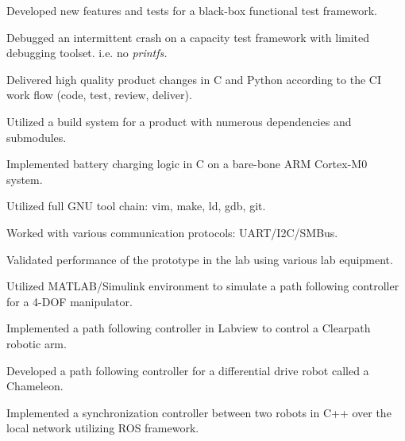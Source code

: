\documentclass[]{deedy-resume-openfont}
\begin{document}

\begin{tightemize}
\item Developed new features and tests for a black-box functional test framework.
\item Debugged an intermittent crash on a capacity test framework with limited debugging toolset. i.e. no \it{printfs}.
\item Delivered high quality product changes in C and Python according to the CI work flow (code, test, review, deliver).
\item Utilized a build system for a product with numerous dependencies and submodules.
\end{tightemize}
\sectionsep

\begin{tightemize}
\item Implemented battery charging logic in C on a bare-bone ARM Cortex-M0 system.
\item Utilized full GNU tool chain: vim, make, ld, gdb, git.
\item Worked with various communication protocols: UART/I2C/SMBus.
\item Validated performance of the prototype in the lab using various lab equipment.
\end{tightemize}
\sectionsep

\begin{tightemize}
\item Utilized MATLAB/Simulink environment to simulate a path following controller for a 4-DOF manipulator.
\item Implemented a path following controller in Labview to control a Clearpath robotic arm.
\item Developed a path following controller for a differential drive robot called a Chameleon.
\item Implemented a synchronization controller between two robots in C++ over the local network utilizing ROS framework.
\end{tightemize}
\sectionsep
\end{document}
